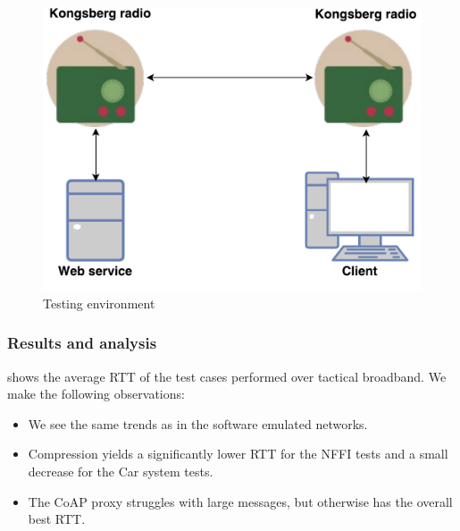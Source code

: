 \begin{figure}[h]
\centering
\includegraphics[scale=0.6]{images/radio_testing_environment.pdf}
\caption{Testing environment}
\label{figure-radio-testing-environment}
\end{figure}

\subsubsection{Results and analysis}

 shows the average RTT of the test cases
performed over tactical broadband. We make the following observations:

\begin{itemize}

    \item We see the same trends as in the software emulated networks.

    \item Compression yields a significantly lower RTT for the NFFI tests and a
    small decrease for the Car system tests.

    \item The CoAP proxy struggles with large messages, but otherwise has the
    overall best RTT.

\end{itemize}

